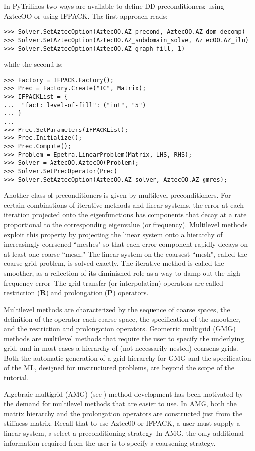 \documentclass[10pt,relax]{SANDreport}
\begin{document}
In PyTrilinos two ways are available to define DD preconditioners: using
AztecOO or using IFPACK. The first approach reads:
\begin{verbatim}
>>> Solver.SetAztecOption(AztecOO.AZ_precond, AztecOO.AZ_dom_decomp)
>>> Solver.SetAztecOption(AztecOO.AZ_subdomain_solve, AztecOO.AZ_ilu)
>>> Solver.SetAztecOption(AztecOO.AZ_graph_fill, 1)
\end{verbatim}
while the second is:
\begin{verbatim}
>>> Factory = IFPACK.Factory();
>>> Prec = Factory.Create("IC", Matrix);
>>> IFPACKList = {
...  "fact: level-of-fill": ("int", "5")
... }
... 
>>> Prec.SetParameters(IFPACKList);
>>> Prec.Initialize();
>>> Prec.Compute();
>>> Problem = Epetra.LinearProblem(Matrix, LHS, RHS);
>>> Solver = AztecOO.AztecOO(Problem);
>>> Solver.SetPrecOperator(Prec)
>>> Solver.SetAztecOption(AztecOO.AZ_solver, AztecOO.AZ_gmres);
\end{verbatim}

\smallskip

Another class of preconditioners is given by multilevel preconditioners.
For certain combinations of iterative methods and linear systems, the
error at each iteration projected onto the eigenfunctions has components
that decay at a rate proportional to the corresponding eigenvalue (or
frequency).  Multilevel methods exploit this property \cite{Briggs2000}
by projecting the linear system onto a hierarchy of increasingly
coarsened ``meshes" so that each error component rapidly decays on at
least one coarse ``mesh."  The linear system on the coarsest ``mesh",
called the coarse grid problem, is solved exactly.  The iterative method
is called the smoother, as a reflection of its diminished role as a way
to damp out the high frequency error.  The grid transfer (or
interpolation) operators are called restriction ($\mathbf{R}$) and
prolongation ($\mathbf{P}$) operators.

Multilevel methods are characterized by the sequence of coarse spaces, the
definition of the operator each coarse space, the specification of the
smoother, and the restriction and prolongation operators.  Geometric multigrid
(GMG) methods  are multilevel methods that require the user to specify the
underlying grid, and in most cases a hierarchy of (not necessarily nested)
  coarsens grids.  Both the automatic generation of a grid-hierarchy for GMG
  and the specification of the ML, designed for unstructured problems, are
  beyond the scope of the tutorial.

Algebraic multigrid (AMG)  (see \cite[Section 8]{Briggs2000}) method
development has been motivated by the demand for multilevel methods that are
easier to use.  In AMG, both the matrix hierarchy and the prolongation
operators are constructed just from the stiffness matrix.  Recall that to use
Aztec00 or IFPACK,  a user must supply a linear system, a select a
preconditioning strategy.  In AMG, the only additional information required
from the user is to specify a coarsening strategy.
\end{document}
